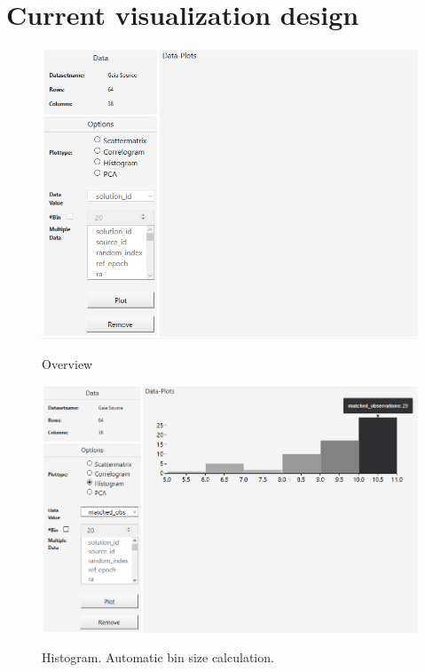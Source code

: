 \documentclass{article}
\begin{document}
\section{Current visualization design}
\begin{figure}[!h]
\centering
\includegraphics[width=1\textwidth]{images/m3/uebersicht.PNG}
\label{fig1}
\caption{Overview}
\end{figure} 
\newpage
\begin{figure}[!h]
\centering
\includegraphics[width=1\textwidth]{images/m3/histogram1.PNG}
\label{fig2}
\caption{Histogram. Automatic bin size calculation.}
\end{figure}
\newpage
\end{document}
